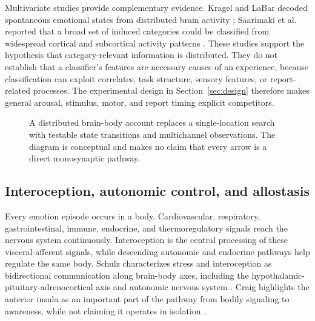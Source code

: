 \documentclass[conference]{IEEEtran}
\begin{document}
Multivariate studies provide complementary evidence. Kragel and LaBar decoded spontaneous emotional states from distributed brain activity \cite{Kragel2016}; Saarimaki et al. reported that a broad set of induced categories could be classified from widespread cortical and subcortical activity patterns \cite{Saarimaki2018}. These studies support the hypothesis that category-relevant information is distributed. They do not establish that a classifier's features are necessary causes of an experience, because classification can exploit correlates, task structure, sensory features, or report-related processes. The experimental design in Section~\ref{sec:design} therefore makes general arousal, stimulus, motor, and report timing explicit competitors.

\begin{figure}[!t]
\centering
{}
\caption{A distributed brain-body account replaces a single-location search with testable state transitions and multichannel observations. The diagram is conceptual and makes no claim that every arrow is a direct monosynaptic pathway.}\label{fig:origin-schematic}
\end{figure}

\subsection{Interoception, autonomic control, and allostasis}

Every emotion episode occurs in a body. Cardiovascular, respiratory, gastrointestinal, immune, endocrine, and thermoregulatory signals reach the nervous system continuously. Interoception is the central processing of these visceral-afferent signals, while descending autonomic and endocrine pathways help regulate the same body. Schulz characterizes stress and interoception as bidirectional communication along brain-body axes, including the hypothalamic-pituitary-adrenocortical axis and autonomic nervous system \cite{Schulz2015}. Craig highlights the anterior insula as an important part of the pathway from bodily signaling to awareness, while not claiming it operates in isolation \cite{Craig2009}.
\end{document}

